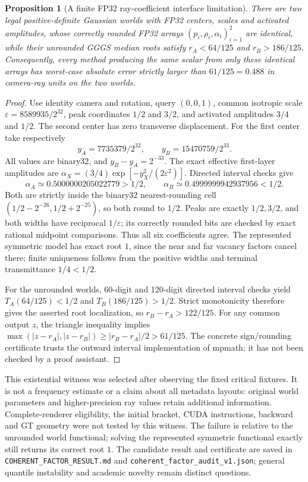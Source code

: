 \documentclass[11pt,a4paper]{article}
\newtheorem{proposition}[theorem]{Proposition}
\begin{document}
\begin{proposition}[A finite FP32 ray-coefficient interface limitation]
There are two legal positive-definite Gaussian worlds with FP32 centers,
scales and activated amplitudes, whose correctly rounded FP32 arrays
$(p_i,\rho_i,\alpha_i)_{i=1}^2$ are identical, while their unrounded
GGGS median roots satisfy $r_A<64/125$ and $r_B>186/125$.
Consequently, every method producing the same scalar from only these
identical arrays has worst-case absolute error strictly larger than
$61/125=0.488$ in camera-ray units on the two worlds.
\end{proposition}
\begin{proof}
Use identity camera and rotation, query $(0,0,1)$, common isotropic
scale $\varepsilon=8589935/2^{32}$, peak coordinates $1/2$ and $3/2$,
and activated amplitudes $3/4$ and $1/2$. The second center has zero
transverse displacement. For the first center take respectively
\[
 y_A=7735379/2^{32},\qquad y_B=15470759/2^{33}.
\]
All values are binary32, and $y_B-y_A=2^{-33}$. The exact effective
first-layer amplitudes are
$\alpha_X=(3/4)\exp[-y_X^2/(2\varepsilon^2)]$.
Directed interval checks give
\[
 \alpha_A\simeq0.5000000205022779>1/2,\qquad
 \alpha_B\simeq0.4999999942937956<1/2.
\]
Both are strictly inside the binary32 nearest-rounding cell
$(1/2-2^{-26},1/2+2^{-25})$, so both round to $1/2$.
Peaks are exactly $1/2,3/2$, and both widths have reciprocal
$1/\varepsilon$; its correctly rounded bits are checked by exact
rational midpoint comparisons. Thus all six coefficients agree.
The represented symmetric model has exact root $1$, since the near
and far vacancy factors cancel there; finite uniqueness follows from
the positive widths and terminal transmittance $1/4<1/2$.

For the unrounded worlds, 60-digit and 120-digit directed interval
checks yield $T_A(64/125)<1/2$ and $T_B(186/125)>1/2$.
Strict monotonicity therefore gives the asserted root localization,
so $r_B-r_A>122/125$. For any common output $z$, the triangle
inequality implies
$\max(|z-r_A|,|z-r_B|)\geq|r_B-r_A|/2>61/125$.
The concrete sign/rounding certificate trusts the outward interval
implementation of mpmath; it has not been checked by a proof assistant.
\end{proof}

This existential witness was selected after observing the fixed critical
fixtures. It is not a frequency estimate or a claim about all metadata
layouts: original world parameters and higher-precision ray values
retain additional information. Complete-renderer eligibility, the
initial bracket, CUDA instructions, backward and GT geometry were not
tested by this witness. The failure is relative to the unrounded world
functional; solving the represented symmetric functional exactly still
returns its correct root $1$. The candidate result and certificate are
saved in \texttt{COHERENT\_FACTOR\_RESULT.md} and
\texttt{coherent\_factor\_audit\_v1.json}; general quantile instability
and academic novelty remain distinct questions.
\end{document}
